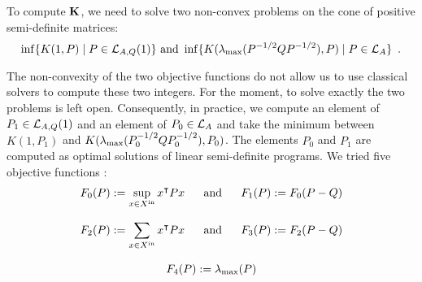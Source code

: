\documentclass[10pt]{llncs}
\begin{document}
To compute $\mathbf{K}$, we need to solve two non-convex problems on the cone of positive semi-definite matrices:
\[
\inf\{K(1,P)\mid P\in\mathcal{L}_{A,Q}(1)\} \text{ and }\inf\{K(\lambda_{\operatorname{max}}(P^{-1/2}QP^{-1/2}),P)\mid P\in\mathcal{L}_{A}\} \enspace.
\]

The non-convexity of the two objective functions do not allow us to use classical solvers to compute these two integers. For the moment, to solve exactly the two problems is left open. Consequently, in practice, we compute an element of $P_1\in\mathcal{L}_{A,Q}(1)$ and an element of $P_0\in\mathcal{L}_{A}$ and take the minimum between $K(1,P_1)$ and $K(\lambda_{\operatorname{max}}(P_0^{-1/2}QP_0^{-1/2}),P_0)$. The elements $P_0$ and $P_1$  are computed as optimal solutions of linear semi-definite programs. We tried five objective functions :
\begin{equation}
\label{objsdp}
\begin{array}{c}
\displaystyle{F_0(P):=\sup_{x\in X^\mathrm{in}} x^\intercal P x}\ \quad \text{ and } \quad\ \displaystyle{F_1(P):=F_0(P-Q)} \\
\\
\displaystyle{F_2(P):=\sum_{x\in X^\mathrm{in}} x^\intercal P x}\ \quad \text{ and } \quad\ F_3(P):=F_2(P-Q)\\
\\
F_4(P):=\lambda_{\operatorname{max}}(P)
\end{array}
\end{equation} 
%
%
%
%
\end{document}
